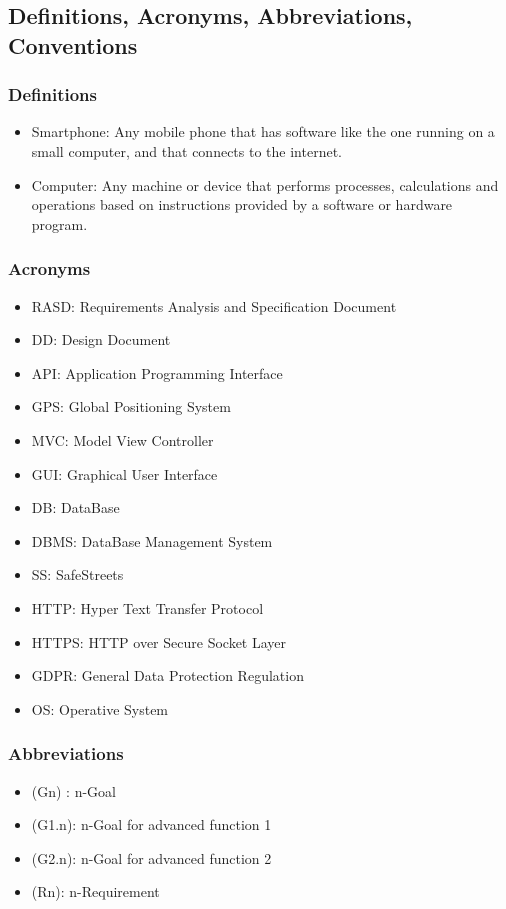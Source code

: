 \subsection{Definitions, Acronyms, Abbreviations, Conventions}
\subsubsection{Definitions}
\begin{itemize}
	\item Smartphone: Any mobile phone that has software like the one running on a small computer, and that connects to the internet.
	\item Computer: Any machine or device that performs processes, calculations and operations based on instructions provided by a software or hardware program.
\end{itemize}
\subsubsection{Acronyms}
\begin{itemize}
	\item RASD: Requirements Analysis and Specification Document
	\item DD: Design Document
	\item API: Application Programming Interface
	\item GPS: Global Positioning System
	\item MVC: Model View Controller
	\item GUI: Graphical User Interface
	\item DB: DataBase
	\item DBMS: DataBase Management System
	\item SS: SafeStreets
	\item HTTP: Hyper Text Transfer Protocol
	\item HTTPS: HTTP over Secure Socket Layer
	\item GDPR: General Data Protection Regulation
	\item OS: Operative System
\end{itemize}
\subsubsection{Abbreviations}
\begin{itemize}
	\item (Gn) : n-Goal
	\item (G1.n): n-Goal for advanced function 1
	\item (G2.n): n-Goal for advanced function 2
	\item (Rn): n-Requirement
\end{itemize}
